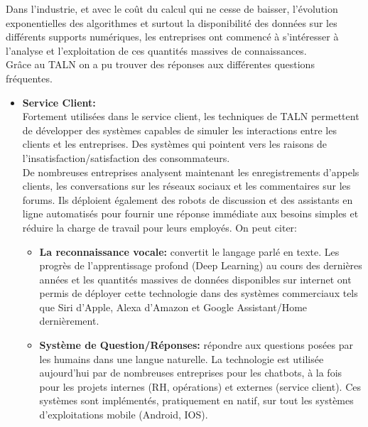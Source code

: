 Dans l'industrie, et avec le coût du calcul qui ne cesse de baisser, l'évolution exponentielles des algorithmes et surtout la disponibilité des données sur les différents supports numériques, les entreprises ont commencé à s'intéresser à l'analyse et l'exploitation de ces quantités massives de connaissances.\\
Grâce au TALN on a pu trouver des réponses aux différentes questions fréquentes. 
\begin{itemize}
    \item \textbf{Service Client:}\\
    Fortement utilisées dans le service client, les techniques de TALN permettent de développer des systèmes capables de simuler les interactions entre les clients et les entreprises. Des systèmes qui pointent vers les raisons de l'insatisfaction/satisfaction des consommateurs.\\
    De nombreuses entreprises analysent maintenant les enregistrements d'appels clients, les conversations sur les réseaux sociaux et les commentaires sur les forums. Ils déploient également des robots de discussion et des assistants en ligne automatisés pour fournir une réponse immédiate aux besoins simples et réduire la charge de travail pour leurs employés. On peut citer: 
    \begin{itemize}
        \item \textbf{La reconnaissance vocale:} convertit le langage parlé en texte. Les progrès de l'apprentissage profond (Deep Learning) au cours des dernières années et les quantités massives de données disponibles sur internet ont permis de déployer cette technologie dans des systèmes commerciaux tels que Siri d'Apple, Alexa d'Amazon et Google Assistant/Home dernièrement.
        \item \textbf{Système de Question/Réponses:} répondre aux questions posées par les humains dans une langue naturelle. La technologie est utilisée aujourd'hui par de nombreuses entreprises pour les chatbots, à la fois pour les projets internes (RH, opérations) et externes (service client). Ces systèmes sont implémentés, pratiquement en natif, sur tout les systèmes d'exploitations mobile (Android, IOS).\\
    \end{itemize}


\end{itemize}
